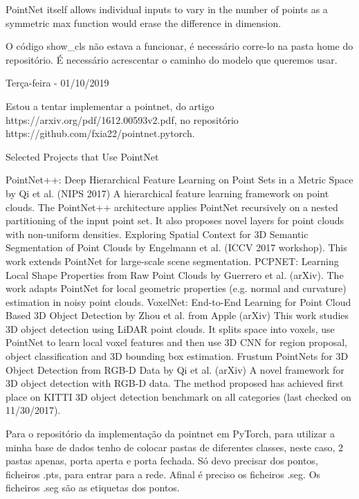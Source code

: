             PointNet itself allows individual inputs to vary in the number of points as a symmetric max function would erase the difference in dimension.
         
            O código show\_cls não estava a funcionar, é necessário corre-lo na pasta home do repositório. É necessário acrescentar o caminho do modelo que queremos usar.
        
         
        \bigskip
        
        Terça-feira - 01/10/2019
        
        Estou a tentar implementar a pointnet, do artigo https://arxiv.org/pdf/1612.00593v2.pdf, no repositório https://github.com/fxia22/pointnet.pytorch.


        Selected Projects that Use PointNet

        PointNet++: Deep Hierarchical Feature Learning on Point Sets in a Metric Space by Qi et al. (NIPS 2017) A hierarchical feature learning framework on point clouds. The PointNet++ architecture applies PointNet recursively on a nested partitioning of the input point set. It also proposes novel layers for point clouds with non-uniform densities.
        Exploring Spatial Context for 3D Semantic Segmentation of Point Clouds by Engelmann et al. (ICCV 2017 workshop). This work extends PointNet for large-scale scene segmentation.
        PCPNET: Learning Local Shape Properties from Raw Point Clouds by Guerrero et al. (arXiv). The work adapts PointNet for local geometric properties (e.g. normal and curvature) estimation in noisy point clouds.
        VoxelNet: End-to-End Learning for Point Cloud Based 3D Object Detection by Zhou et al. from Apple (arXiv) This work studies 3D object detection using LiDAR point clouds. It splits space into voxels, use PointNet to learn local voxel features and then use 3D CNN for region proposal, object classification and 3D bounding box estimation.
        Frustum PointNets for 3D Object Detection from RGB-D Data by Qi et al. (arXiv) A novel framework for 3D object detection with RGB-D data. The method proposed has achieved first place on KITTI 3D object detection benchmark on all categories (last checked on 11/30/2017).

        Para o repositório da implementação da pointnet em PyTorch, para utilizar a minha base de dados tenho de colocar pastas de diferentes classes, neste caso, 2 pastas apenas, porta aperta e porta fechada. Só devo precisar dos pontos, ficheiros .pts, para entrar para a rede. Afinal é preciso os ficheiros .seg. 
        Os ficheiros .seg são as etiquetas dos pontos.
        

